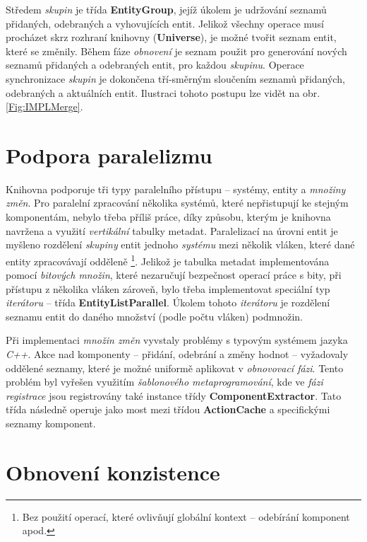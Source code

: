 Středem \emph{skupin} je třída \textbf{EntityGroup}, jejíž úkolem je udržování seznamů přidaných, odebraných a vyhovujících entit. Jelikož všechny operace musí procházet skrz rozhraní knihovny (\textbf{Universe}), je možné tvořit seznam entit, které se změnily. Během fáze \emph{obnovení} je seznam použit pro generování nových seznamů přidaných a odebraných entit, pro každou \emph{skupinu}. Operace synchronizace \emph{skupin} je dokončena tří-směrným sloučením seznamů přidaných, odebraných a aktuálních entit. Ilustraci tohoto postupu lze vidět na obr. \ref{Fig:IMPLMerge}.

\section{Podpora paralelizmu}

Knihovna podporuje tři typy paralelního přístupu -- systémy, entity a \emph{množiny změn}. Pro paralelní zpracování několika systémů, které nepřistupují ke stejným komponentám, nebylo třeba příliš práce, díky způsobu, kterým je knihovna navržena a využití \emph{vertikální} tabulky metadat. Paralelizací na úrovni entit je myšleno rozdělení \emph{skupiny} entit jednoho \emph{systému} mezi několik vláken, které dané entity zpracovávají odděleně \footnote{Bez použití operací, které ovlivňují globální kontext -- odebírání komponent apod.}. Jelikož je tabulka metadat implementována pomocí \emph{bitových množin}, které nezaručují bezpečnost operací práce s bity, při přístupu z několika vláken zároveň, bylo třeba implementovat speciální typ \emph{iterátoru} -- třída \textbf{EntityListParallel}. Úkolem tohoto \emph{iterátoru} je rozdělení seznamu entit do daného množství (podle počtu vláken) podmnožin.

Při implementaci \emph{množin změn} vyvstaly problémy s typovým systémem jazyka \emph{C++}. Akce nad komponenty -- přidání, odebrání a změny hodnot -- vyžadovaly oddělené seznamy, které je možné uniformě aplikovat v \emph{obnovovací fázi}. Tento problém byl vyřešen využitím \emph{šablonového metaprogramování}, kde ve \emph{fázi registrace} jsou registrovány také instance třídy \textbf{ComponentExtractor}. Tato třída následně operuje jako most mezi třídou \textbf{ActionCache} a specifickými seznamy komponent.

\section{Obnovení konzistence}

